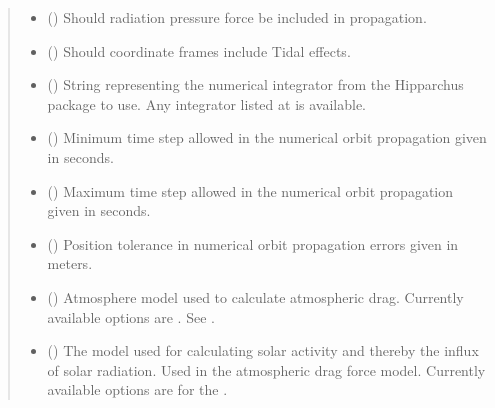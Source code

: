 \documentclass[letterpaper,10pt,english]{sphinxmanual}
\begin{document}
\begin{fulllineitems}
\begin{quote}
\begin{description}
\begin{itemize}
\item {} 
 () \textendash{} Should radiation pressure force be included in propagation.

\item {} 
 () \textendash{} Should coordinate frames include Tidal effects.

\item {} 
 () \textendash{} 
String representing the numerical integrator from the Hipparchus package to use. Any integrator listed at  is available.


\item {} 
 () \textendash{} Minimum time step allowed in the numerical orbit propagation given in seconds.

\item {} 
 () \textendash{} Maximum time step allowed in the numerical orbit propagation given in seconds.

\item {} 
 () \textendash{} Position tolerance in numerical orbit propagation errors given in meters.

\item {} 
 () \textendash{} 
Atmosphere model used to calculate atmospheric drag. Currently available options are . See .


\item {} 
 () \textendash{} 
The model used for calculating solar activity and thereby the influx of solar radiation. Used in the atmospheric drag force model. Currently available options are  for the .



\end{itemize}
\end{description}
\end{quote}
\end{fulllineitems}
\end{document}
